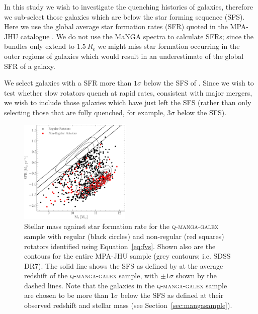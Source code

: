 \documentclass[useAMS,usenatbib]{mn2e}
\begin{document}
In this study we wish to investigate the quenching histories of galaxies, therefore we sub-select those galaxies which are below the star forming sequence (SFS). Here we use the global average star formation rates (SFR) quoted in the MPA-JHU catalogue \citep[][which are corrected for aperture bias]{kauffmann03, brinchmann04}. We do not use the MaNGA spectra to calculate SFRs; since the bundles only extend to $1.5~R_e$ we might miss star formation occurring in the outer regions of galaxies which would result in an underestimate of the global SFR of a galaxy. 

We select galaxies with a SFR more than $1\sigma$ below the SFS of \cite{peng10}. Since we wish to test whether slow rotators quench at rapid rates, consistent with major mergers, we wish to include those galaxies which have just left the SFS (rather than only selecting those that are fully quenched, for example, $3\sigma$ below the SFS).

\begin{figure}
\centering
\includegraphics[width=0.475\textwidth]{../figures/MASS_SFR_FR_SR_VOR10_nonkdc.pdf}
\caption{Stellar mass against star formation rate for the \textsc{q-manga-galex} sample with regular (black circles) and non-regular (red squares) rotators identified using Equation~\ref{eq:fvs}. Shown also are the contours for the entire MPA-JHU sample (grey contours; i.e. SDSS DR7). The solid line shows the SFS as defined by \protect\cite{peng10} at the average redshift of the \textsc{q-manga-galex} sample, with $\pm 1 \sigma$ shown by the dashed lines. Note that the galaxies in the \textsc{q-manga-galex} sample are chosen to be more than $1\sigma$ below the SFS as defined at their observed redshift and stellar mass (see Section~\protect\ref{sec:mangasample}).}
\label{fig:masvsfr}
\end{figure}
\end{document}
